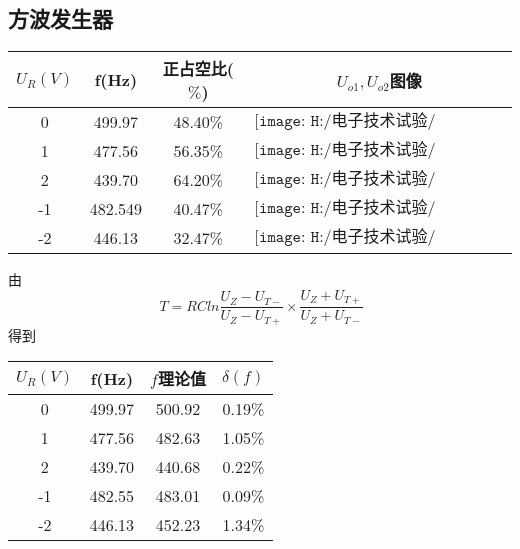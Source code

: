 \documentclass{article}
\begin{document}
\subsection{方波发生器}
\begin{table}[h]
    \centering  
    \begin{tabular}{c|c|c|c}
        \hline
            $U_{R}(V)$      & f(Hz)         & 正占空比($\%$)    & $U_{o1},U_{o2}$图像 \\ \hline
              0             & 499.97       &  48.40\%           &  $\texttt{[image: H:/电子技术试验/4-16/4-16-6.png]}$  \\ \hline
              1             & 477.56       &  56.35\%           &  $\texttt{[image: H:/电子技术试验/4-16/4-16-5.png]}$             \\ \hline
              2             & 439.70       &  64.20\%           &  $\texttt{[image: H:/电子技术试验/4-16/4-16-4.png]}$           \\ \hline
              -1            & 482.549      &  40.47\%           &  $\texttt{[image: H:/电子技术试验/4-16/4-16-7.png]}$          \\ \hline
              -2            & 446.13       &  32.47\%           &  $\texttt{[image: H:/电子技术试验/4-16/4-16-8.png]}$        \\ \hline
    \end{tabular}
  \end{table}
\newpage
由
\begin{equation*}
  \ T=RCln\frac{U_Z-U_{T-}}{U_Z-U_{T+}}\times \frac{U_Z+U_{T+}}{U_Z+U_{T-}}
\end{equation*}
得到
\begin{table}[h]
  \centering  
  \begin{tabular}{c|c|c|c}
      \hline
          $U_{R}(V)$      & f(Hz)         & $f$理论值   & $\delta (f) $\\ \hline
            0             & 499.97       &  500.92           &  0.19\% \\ \hline
            1             & 477.56       &  482.63           &  1.05\%           \\ \hline
            2             & 439.70       &  440.68           &  0.22\%        \\ \hline
            -1            & 482.55      &  483.01            &  0.09\%  \\ \hline
            -2            & 446.13       &  452.23           &  1.34\%    \\ \hline
  \end{tabular}
\end{table}
\end{document}
